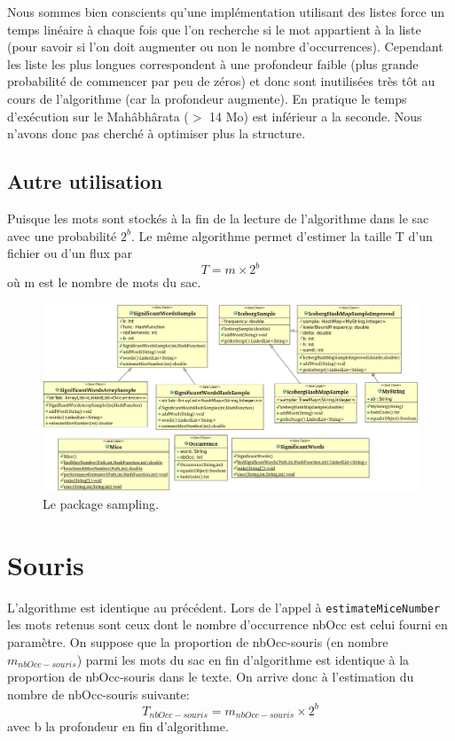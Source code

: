 \documentclass[12pt,a4paper,titlepage]{article}
\newcommand{\class}[1]{\texttt{#1}}
\begin{document}
Nous sommes bien conscients qu'une implémentation utilisant des listes force un temps linéaire à chaque fois que l'on recherche si le mot appartient à la liste (pour savoir si l'on doit augmenter ou non le nombre d'occurrences). Cependant les liste les plus longues correspondent à une profondeur faible (plus grande probabilité de commencer par peu de zéros) et donc sont inutilisées très tôt au cours de l'algorithme (car la profondeur augmente). En pratique le temps d'exécution sur le Mahâbhârata ($>$ 14 Mo) est inférieur a la seconde. Nous n'avons donc pas cherché à optimiser plus la structure.

\subsection{Autre utilisation}

Puisque les mots sont stockés à la fin de la lecture de l'algorithme dans le sac avec une probabilité $2^{b}$. Le même algorithme permet d'estimer la taille T d'un fichier ou d'un flux par
$$ T = m \times 2^{b} $$
où m est le nombre de mots du sac.

\begin{figure}
	\label{fig:samplingPackage}
	\centering
	\includegraphics[scale=0.55, angle=90]{../Java Workspace/Test Hash/samplingPackage.png}
	\caption{Le package sampling.}
\end{figure}



\newpage
\section{Souris}

L'algorithme est identique au précédent. Lors de l'appel à \class{estimateMiceNumber} les mots retenus sont ceux dont le nombre d'occurrence nbOcc est celui fourni en paramètre. On suppose que la proportion de nbOcc-souris (en nombre $m_{nbOcc-souris}$) parmi les mots du sac en fin d'algorithme est identique à la proportion de nbOcc-souris dans le texte. On arrive donc à l'estimation du nombre de nbOcc-souris suivante:
$$ T_{nbOcc-souris} = m_{nbOcc-souris} \times 2^{b} $$
avec b la profondeur en fin d'algorithme.
\end{document}

